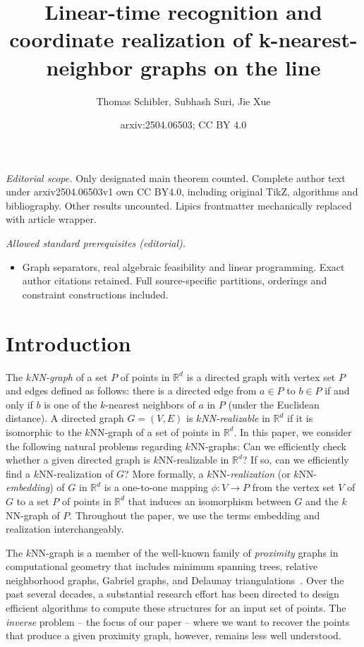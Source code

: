 \documentclass[11pt]{article}
\title{Linear-time recognition and coordinate realization of k-nearest-neighbor graphs on the line}
\author{Thomas Schibler, Subhash Suri, Jie Xue}
\date{arxiv:2504.06503; CC BY 4.0}
\begin{document}
\maketitle
\noindent\textit{Editorial scope.} Only designated main theorem counted. Complete author text under arxiv2504.06503v1 own CC BY4.0, including original TikZ, algorithms and bibliography. Other results uncounted. Lipics frontmatter mechanically replaced with article wrapper.\par\medskip
\noindent\textit{Allowed standard prerequisites (editorial).}\begin{itemize}
\item Graph separators, real algebraic feasibility and linear programming. Exact author citations retained. Full source-specific partitions, orderings and constraint constructions included.
\end{itemize}\medskip
\section{Introduction}

The \textit{$k$NN-graph} of a set $P$ of points in $\mathbb{R}^d$ is a directed graph with vertex set $P$ and edges defined as follows: there is a directed edge from $a \in P$ to $b \in P$ if and only if $b$ is one of the $k$-nearest neighbors of $a$ in $P$ (under the Euclidean distance).
A directed graph $G = (V, E)$ is \textit{$k$NN-realizable} in $\mathbb{R}^d$ if it is isomorphic to the $k$NN-graph of a set of points in $\mathbb{R}^d$.
In this paper, we consider the following natural problems regarding $k$NN-graphs:
Can we efficiently check whether a given directed graph is $k$NN-realizable in $\mathbb{R}^d$?
If so, can we efficiently find a $k$NN-realization of $G$?
More formally, a $k$NN-\emph{realization} (or $k$NN-\emph{embedding}) of $G$ in $\mathbb{R}^d$ is a one-to-one mapping $\phi: V \rightarrow P$ from the vertex set $V$ of $G$ to a set $P$ of points in $\mathbb{R}^d$ that induces an isomorphism between $G$ and the $k$NN-graph of $P$.
Throughout the paper, we use the terms embedding and realization interchangeably.

The $k$NN-graph is a member of the well-known family of \emph{proximity} graphs in computational geometry that includes minimum spanning trees, relative neighborhood graphs, Gabriel graphs, and Delaunay triangulations~\cite{cgbook}. Over the past several decades, a substantial research effort has been directed to design efficient algorithms to compute these structures for an input set of points.  The \emph{inverse} problem -- the focus of our paper -- where we want to recover the points that produce a given proximity graph, however, remains  less well understood.
\end{document}
